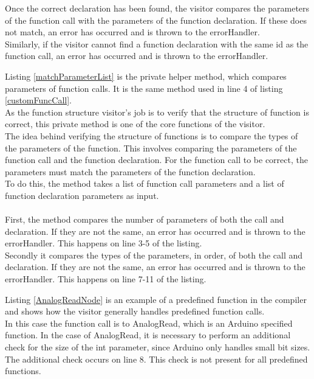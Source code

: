 Once the correct declaration has been found, the visitor compares the parameters of the function call with the parameters of the function declaration. If these does not match, an error has occurred and is thrown to the errorHandler.\\
Similarly, if the visitor cannot find a function declaration with the same id as the function call, an error has occurred and is thrown to the errorHandler.

\noindent\newline
Listing \ref{matchParameterList} is the private helper method, which compares parameters of function calls. It is the same method used in line 4 of listing \ref{customFuncCall}.\\
As the function structure visitor’s job is to verify that the structure of function is correct, this private method is one of the core functions of the visitor.\\
The idea behind verifying the structure of functions is to compare the types of the parameters of the function. This involves comparing the parameters of the function call and the function declaration. For the function call to be correct, the parameters must match the parameters of the function declaration.\\
To do this, the method takes a list of function call parameters and a list of function declaration parameters as input.
\\\\
First, the method compares the number of parameters of both the call and declaration. If they are not the same, an error has occurred and is thrown to the errorHandler. This happens on line 3-5 of the listing.\\
Secondly it compares the types of the parameters, in order, of both the call and declaration. If they are not the same, an error has occurred and is thrown to the errorHandler. This happens on line 7-11 of the listing.

\noindent\newline
Listing \ref{AnalogReadNode} is an example of a predefined function in the compiler and shows how the visitor generally handles predefined function calls.\\
In this case the function call is to AnalogRead, which is an Arduino specified function. In the case of AnalogRead, it is necessary to perform an additional check for the size of the int parameter, since Arduino only handles small bit sizes. The additional check occurs on line 8. This check is not present for all predefined functions.
